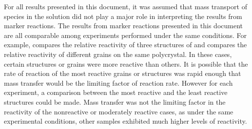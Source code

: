 \label{masstransfer}
For all results presented in this document, it was assumed that mass transport of species
in the solution did not play a major role in interpreting the results from marker
reactions. The results from marker reactions presented in this document are all comparable
among experiments performed under the same conditions. For example,
 compares the relative reactivity of three
structures of  and  compares the relative
reactivity of different  grains on the same polycrystal. In these cases, certain
structures or grains were more reactive than others. It is possible that the rate of
reaction of the most reactive grains or structures was rapid enough that mass transfer
would be the limiting factor of reaction rate. However for each experiment, a comparison
between the most reactive and the least reactive structures could be made. Mass transfer
was not the limiting factor in the reactivity of the nonreactive or moderately reactive
cases, as under the same experimental conditions, other samples exhibited much higher
levels of reactivity.

